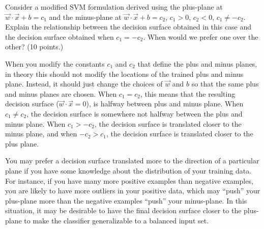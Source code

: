 \documentclass[fleqn]{homework}
\begin{document}
  \maketitle

  \begin{problem}{1}
    \begin{question}
      Consider a modified SVM formulation derived using the plus-plane at
      $\vec{w}\cdot\vec{x} + b = c_1$ and the minus-plane at
      $\vec{w}\cdot\vec{x}+b=c_2$, $c_1>0$, $c_2<0$, $c_1 \ne -c_2$.  Explain
      the relationship between the decision surface obtained in this case and
      the decision surface obtained when $c_1 = -c_2$.  When would we prefer one
      over the other? (10 points.)
    \end{question}

    When you modify the constants $c_1$ and $c_2$ that define the plus and minus
    planes, in theory this should not modify the locations of the trained plus
    and minus plane.  Instead, it should just change the choices of $\vec{w}$
    and $b$ so that the same plus and minus planes are chosen.  When
    $c_1 = c_2$, this means that the resulting decision surface
    ($\vec{w}\cdot\vec{x} = 0$), is halfway between plus and minus plane.  When
    $c_1 \ne c_2$, the decision surface is somewhere not halfway between the
    plus and minus plane.  When $c_1 > -c_2$, the decision surface is translated
    closer to the minus plane, and when $-c_2 > c_1$, the decision surface is
    translated closer to the plus plane.

    You may prefer a decision surface translated more to the direction of a
    particular plane if you have some knowledge about the distribution of your
    training data.  For instance, if you have many more positive examples than
    negative examples, you are likely to have more outliers in your positive
    data, which may ``push'' your plus-plane more than the negative examples
    ``push'' your minus-plane.  In this situation, it may be desirable to have
    the final decision surface closer to the plus-plane to make the classifier
    generalizable to a balanced input set.
  \end{problem}
\end{document}
